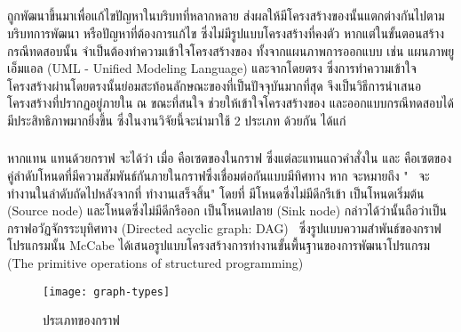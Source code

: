 \subsection{\FirstTimeDefine{\ProgramGraph}{\ProgramGraphEN}} 
\label{sec:sub:pg}

{\software} ถูกพัฒนาขึ้นมาเพื่อแก้ไขปัญหาในบริบทที่หลากหลาย ส่งผลให้มีโครงสร้างของ{\sourcecode}นั้นแตกต่างกันไปตามบริบทการพัฒนา
หรือปัญหาที่ต้องการแก้ไข ซึ่งไม่มีรูปแบบโครงสร้างที่คงตัว หากแต่ในขั้นตอนสร้างกรณีทดสอบนั้น\FirstTimeDefine{\tester}{\testerEN}
จำเป็นต้องทำความเข้าใจโครงสร้างของ{\software} ทั้งจากแผนภาพการออกแบบ เช่น แผนภาพยูเอ็มแอล (UML - Unified Modeling Language) 
และจาก{\sourcecode}โดยตรง ซึ่งการทำความเข้าใจโครงสร้างผ่าน{\sourcecode}โดยตรงนั้นย่อมสะท้อนลักษณะของ{\software}ที่เป็นปัจจุบันมากที่สุด
{\ProgramGraph} จึงเป็นวิธีการนำเสนอโครงสร้างที่ปรากฏอยู่ภายใน{\software} ณ ขณะที่สนใจ ช่วยให้{\tester}เข้าใจโครงสร้างของ{\software}
และออกแบบกรณีทดสอบได้มีประสิทธิภาพมากยิ่งขึ้น ซึ่งในงานวิจัยนี้จะนำ{\ProgramGraph}มาใช้ 2 ประเภท ด้วยกัน ได้แก่

\subsubsection{\FirstTimeDefine{\cfg}{\cfgen}}
\label{sec:sub:sub:cfg}

หากแทน{\software}  แทนด้วยกราฟ  จะได้ว่า  เมื่อ  
คือเซตของ{\Node}ในกราฟ ซึ่งแต่ละ{\Node}แทนแถวคำสั่งใน{\sourcecode} และ  
คือเซตของคู่ลำดับโหนดที่มีความสัมพันธ์กันภายในกราฟซึ่งเชื่อมต่อกันแบบมีทิศทาง หาก  จะหมายถึง 
"\Node\  จะทำงานในลำดับถัดไปหลังจากที่  ทำงานเสร็จสิ้น" \cite{Jorgensen2013} 
โดยที่  มีโหนดซึ่งไม่มีดีกรีเข้า  เป็นโหนดเริ่มต้น (Source node) 
และโหนดซึ่งไม่มีดีกรีออก  เป็นโหนดปลาย (Sink node) 
กล่าวได้ว่า{\cfg}นั้นถือว่าเป็นกราฟอวัฏจักรระบุทิศทาง (Directed acyclic graph: DAG) \cite{Bang-Jensen2009}\ 
ซึ่งรูปแบบความสำพันธ์ของกราฟโปรแกรมนั้น McCabe \cite{Watson1996} 
ได้เสนอรูปแบบโครงสร้างการทำงานขั้นพื้นฐานของการพัฒนาโปรแกรม (The primitive operations of structured programming) 
\figref{fig:graphtype}

\begin{figure}[ht!]
    \centering
    \texttt{[image: graph-types]}
    \caption{ประเภทของกราฟ}
    \label{fig:graphtype}
\end{figure}

